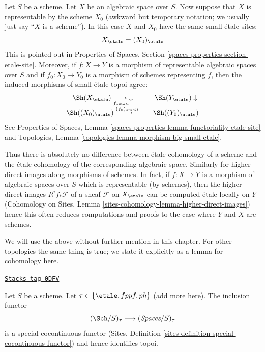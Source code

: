 \medskip\noindent
Let $S$ be a scheme. Let $X$ be an algebraic space over $S$.
Now suppose that $X$ is representable by the scheme $X_0$
(awkward but temporary notation; we usually just say ``$X$
is a scheme''). In this case $X$ and $X_0$ have the same small
\'etale sites:
$$
X_\etale = (X_0)_\etale
$$
This is pointed out in
Properties of Spaces, Section \ref{spaces-properties-section-etale-site}.
Moreover, if $f : X \to Y$ is a morphism of representable algebraic spaces
over $S$ and if $f_0 : X_0 \to Y_0$ is a morphism of
schemes representing $f$, then the induced morphisms of small
\'etale topoi agree:
$$
\begin{array}{ccc}\Sh(X_\etale) \underset{f_{small}}{\longrightarrow}\downarrow &  & \Sh(Y_\etale) \downarrow \\ \Sh((X_0)_\etale) \overset{(f_0)_{small}}{\longrightarrow} &  & \Sh((Y_0)_\etale)\end{array}
$$
See Properties of Spaces, Lemma
\ref{spaces-properties-lemma-functoriality-etale-site} and
Topologies, Lemma \ref{topologies-lemma-morphism-big-small-etale}.

\medskip\noindent
Thus there is absolutely no difference between \'etale cohomology
of a scheme and the \'etale cohomology of the corresponding algebraic space.
Similarly for higher direct images along morphisms of schemes.
In fact, if $f : X \to Y$ is a morphism of algebraic spaces over $S$
which is representable (by schemes), then the higher direct images
$R^if_*\mathcal{F}$ of a sheaf $\mathcal{F}$ on $X_\etale$
can be computed \'etale locally on $Y$ (Cohomology on Sites,
Lemma \ref{sites-cohomology-lemma-higher-direct-images})
hence this often reduces computations and proofs to the case
where $Y$ and $X$ are schemes.

\medskip\noindent
We will use the above without further mention in this chapter.
For other topologies the same thing is true; we state it
explicitly as a lemma for cohomology here.

\begin{lemma}
\label{spaces-more-cohomology-lemma-compare-cohomology-other-topologies}
\href{https://stacks.math.columbia.edu/tag/0DFV}{\texttt{Stacks tag 0DFV}}

Let $S$ be a scheme. Let $\tau \in \{\etale, fppf, ph\}$ (add more here).
The inclusion functor
$$
(\Sch/S)_\tau \longrightarrow (\textit{Spaces}/S)_\tau
$$
is a special cocontinuous functor
(Sites, Definition \ref{sites-definition-special-cocontinuous-functor})
and hence identifies topoi.
\end{lemma}

